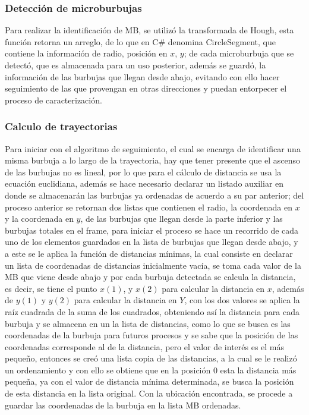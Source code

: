 \documentclass[12pt,twocolumn,a4paper]{article}
\begin{document}
\subsubsection{Detección de microburbujas}

Para realizar la identificación de MB, se utilizó la transformada de Hough, esta función retorna un arreglo, de lo que en C\# denomina CircleSegment, que contiene la información de radio, posición en $x$, $y$; de cada microburbuja que se detectó, que es almacenada para un uso posterior, además se guardó, la información de las burbujas que llegan desde abajo, evitando con ello hacer seguimiento de las que provengan en otras direcciones y puedan entorpecer el proceso de caracterización. 


\subsubsection{Calculo de trayectorias}

Para iniciar con el algoritmo de seguimiento, el cual se encarga de identificar una misma burbuja a lo largo de la trayectoria, hay que tener presente que el ascenso de las burbujas no es lineal, por lo que para el cálculo de distancia se usa la ecuación euclidiana, además se hace necesario declarar un listado auxiliar en donde se almacenarán las burbujas ya ordenadas de acuerdo a su par anterior; del proceso anterior se retornan dos listas que contienen el radio, la coordenada en $x$ y la coordenada en $y$, de las burbujas que llegan desde la parte inferior y las burbujas totales en el frame,  para iniciar el proceso se hace un recorrido de cada uno de los elementos guardados en la lista de burbujas que llegan desde abajo, y a este se le aplica la función de distancias mínimas, la cual consiste en declarar un lista de coordenadas de distancias inicialmente vacía, se toma cada valor de la MB que viene desde abajo y por cada burbuja detectada se calcula la distancia, es decir, se tiene el  punto $x(1)$, y $x(2)$ para calcular la distancia en $x$, además de $y(1)$ y $y(2)$ para calcular la distancia en $Y$, con los dos valores se aplica la raíz cuadrada de la suma de los cuadrados,  obteniendo así la distancia para cada burbuja y se almacena en un la lista de distancias, como lo que se busca es las coordenadas de la burbuja para futuros procesos y se sabe que la posición de las coordenadas corresponde al de la distancia, pero el valor de interés es el más pequeño, entonces se creó una lista copia de las distancias, a la cual se le realizó un ordenamiento y con ello se obtiene que en la posición 0 esta la distancia más pequeña, ya con el valor de distancia mínima determinada, se busca la posición de esta distancia en la lista original. Con la ubicación encontrada, se procede a guardar las coordenadas de la burbuja en la lista MB ordenadas.
\end{document}
